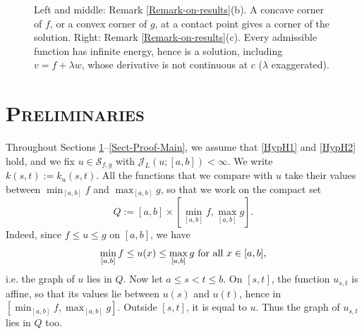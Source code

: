 \documentclass[reqno,12pt]{amsart}
\numberwithin{equation}{section}
\def\J{\mathcal{J}_L}
\def\Sol{\mathcal{S}_{f,g}}
\theoremstyle{remark}
\begin{document}
\begin{figure}[H]
\caption{Left and middle: Remark \ref{Remark-on-results}(b). A concave corner of $f$, or a convex corner of $g$, at a contact point gives a corner of the solution. Right: Remark \ref{Remark-on-results}(c). Every admissible function has infinite energy, hence is a solution, including $v=f+\lambda w$, whose derivative is not continuous at $c$ ($\lambda$ exaggerated).}\label{Fig-examples}
\end{figure}




\FloatBarrier

\section{\textsc{\textsf{Preliminaries}}}\label{Sect-Preliminaries}

Throughout Sections \ref{Sect-Preliminaries}--\ref{Sect-Proof-Main}, we assume that \ref{HypH1} and \ref{HypH2} hold, and we fix $u\in\Sol$ with $\J(u;[a,b])<\infty$. We write $k(s,t):=k_u(s,t)$. All the functions that we compare with $u$ take their values between $\min_{[a,b]}f$ and $\max_{[a,b]}g$, so that we work on the compact set
\begin{equation*}
Q:=[a,b]\times\left[\min_{[a,b]}f,\max_{[a,b]}g\right].
\end{equation*}
Indeed, since $f\leq u\leq g$ on $[a,b]$, we have
\begin{equation*}
\min_{[a,b]}f\leq u(x)\leq\max_{[a,b]}g\hbox{ for all }x\in[a,b],
\end{equation*}
i.e. the graph of $u$ lies in $Q$. Now let $a\leq s<t\leq b$. On $[s,t]$, the function $u_{s,t}$ is affine, so that its values lie between $u(s)$ and $u(t)$, hence in $[\min_{[a,b]}f,\max_{[a,b]}g]$. Outside $[s,t]$, it is equal to $u$. Thus the graph of $u_{s,t}$ lies in $Q$ too.
\end{document}
